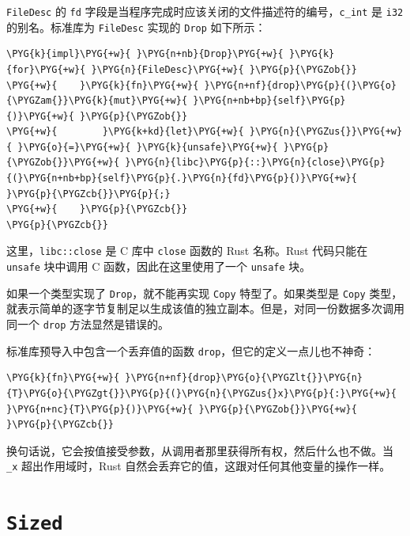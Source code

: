 \texttt{FileDesc} 的 \texttt{fd} 字段是当程序完成时应该关闭的文件描述符的编号，\texttt{c\_int} 是 \texttt{i32} 的别名。标准库为 \texttt{FileDesc} 实现的 \texttt{Drop} 如下所示：

\begin{Verbatim}[commandchars=\\\{\},breaklines=true,breakanywhere=true,fontsize=\codefont,xleftmargin=17bp]
\PYG{k}{impl}\PYG{+w}{ }\PYG{n+nb}{Drop}\PYG{+w}{ }\PYG{k}{for}\PYG{+w}{ }\PYG{n}{FileDesc}\PYG{+w}{ }\PYG{p}{\PYGZob{}}
\PYG{+w}{    }\PYG{k}{fn}\PYG{+w}{ }\PYG{n+nf}{drop}\PYG{p}{(}\PYG{o}{\PYGZam{}}\PYG{k}{mut}\PYG{+w}{ }\PYG{n+nb+bp}{self}\PYG{p}{)}\PYG{+w}{ }\PYG{p}{\PYGZob{}}
\PYG{+w}{        }\PYG{k+kd}{let}\PYG{+w}{ }\PYG{n}{\PYGZus{}}\PYG{+w}{ }\PYG{o}{=}\PYG{+w}{ }\PYG{k}{unsafe}\PYG{+w}{ }\PYG{p}{\PYGZob{}}\PYG{+w}{ }\PYG{n}{libc}\PYG{p}{::}\PYG{n}{close}\PYG{p}{(}\PYG{n+nb+bp}{self}\PYG{p}{.}\PYG{n}{fd}\PYG{p}{)}\PYG{+w}{ }\PYG{p}{\PYGZcb{}}\PYG{p}{;}
\PYG{+w}{    }\PYG{p}{\PYGZcb{}}
\PYG{p}{\PYGZcb{}}
\end{Verbatim}

这里，\texttt{libc::close} 是 C 库中 \texttt{close} 函数的 Rust 名称。Rust 代码只能在 \texttt{unsafe} 块中调用 C 函数，因此在这里使用了一个 \texttt{unsafe} 块。

如果一个类型实现了 \texttt{Drop}，就不能再实现 \texttt{Copy} 特型了。如果类型是 \texttt{Copy} 类型，就表示简单的逐字节复制足以生成该值的独立副本。但是，对同一份数据多次调用同一个 \texttt{drop} 方法显然是错误的。

标准库预导入中包含一个丢弃值的函数 \texttt{drop}，但它的定义一点儿也不神奇：

\begin{Verbatim}[commandchars=\\\{\},breaklines=true,breakanywhere=true,fontsize=\codefont,xleftmargin=17bp]
\PYG{k}{fn}\PYG{+w}{ }\PYG{n+nf}{drop}\PYG{o}{\PYGZlt{}}\PYG{n}{T}\PYG{o}{\PYGZgt{}}\PYG{p}{(}\PYG{n}{\PYGZus{}x}\PYG{p}{:}\PYG{+w}{ }\PYG{n+nc}{T}\PYG{p}{)}\PYG{+w}{ }\PYG{p}{\PYGZob{}}\PYG{+w}{ }\PYG{p}{\PYGZcb{}}
\end{Verbatim}

换句话说，它会按值接受参数，从调用者那里获得所有权，然后什么也不做。当 \texttt{\_x} 超出作用域时，Rust 自然会丢弃它的值，这跟对任何其他变量的操作一样。

\section{\texttt{Sized}}

